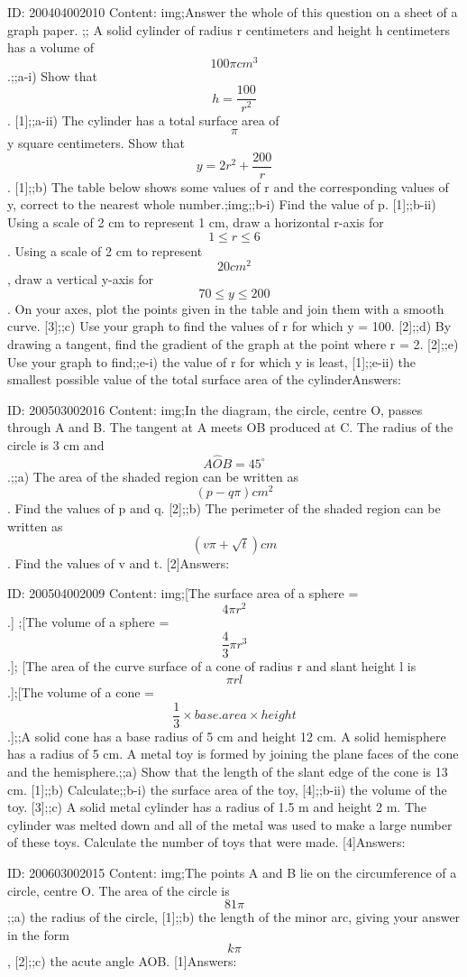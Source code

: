 \documentclass{article}
\begin{document}
ID: 200404002010
Content:
img;Answer the whole of this question on a sheet of a graph paper. ;; A solid cylinder of radius r centimeters and height h centimeters has a volume of $$100\pi cm^{3} $$.;;a-i) Show that $$h=\frac{100}{r^{2}}$$. [1];;a-ii) The cylinder has a total surface area of $$\pi$$y square centimeters. Show that $$y=2r^{2} +\frac{200}{r}$$. [1];;b) The table below shows some values of r and the corresponding values of y, correct to the nearest whole number.;img;;b-i) Find the value of p. [1];;b-ii) Using a scale of 2 cm to represent 1 cm, draw a horizontal r-axis for $$1\leq r\leq 6$$. Using a scale of 2 cm to represent $$20 cm^{2} $$, draw a vertical y-axis for $$70\leq y\leq 200$$. On your axes, plot the points given in the table and join them with a smooth curve. [3];;c) Use your graph to find the values of r for which y = 100. [2];;d) By drawing a tangent, find the gradient of the graph at the point where r = 2. [2];;e) Use your graph to find;;e-i) the value of r for which y is least, [1];;e-ii) the smallest possible value of the total surface area of the cylinderAnswers:

ID: 200503002016
Content:
img;In the diagram, the circle, centre O, passes through A and B. The tangent at A meets OB produced at C. The radius of the circle is 3 cm and $$A \hat OB=45^{\circ}$$.;;a) The area of the shaded region can be written as $$(p-q \pi) cm^{2} $$. Find the values of p and q. [2];;b) The perimeter of the shaded region can be written as $$(v \pi + \sqrt{t})cm$$. Find the values of v and t. [2]Answers:

ID: 200504002009
Content:
img;[The surface area of a sphere = $$4 \pi r^{2} $$.] ;[The volume of a sphere = $$\frac{4}{3} \pi r^{3} $$.]; [The area of the curve surface of a cone of radius r and slant height l is $$\pi rl$$.];[The volume of a cone = $$\frac{1}{3} \times  base.area \times height$$.];;A solid cone has a base radius of 5 cm and height 12 cm. A solid hemisphere has a radius of 5 cm. A metal toy is formed by joining the plane faces of the cone and the hemisphere.;;a) Show that the length of the slant edge of the cone is 13 cm. [1];;b) Calculate;;b-i) the surface area of the toy, [4];;b-ii) the volume of the toy. [3];;c) A solid metal cylinder has a radius of 1.5 m and height 2 m. The cylinder was melted down and all of the metal was used to make a large number of these toys. Calculate the number of toys that were made. [4]Answers:

ID: 200603002015
Content:
img;The points A and B lie on the circumference of a circle, centre O. The area of the circle is $$81\pi $$;;a) the radius of the circle, [1];;b) the length of the minor arc, giving your answer in the form $$k \pi$$, [2];;c) the acute angle AOB. [1]Answers:
\end{document}
